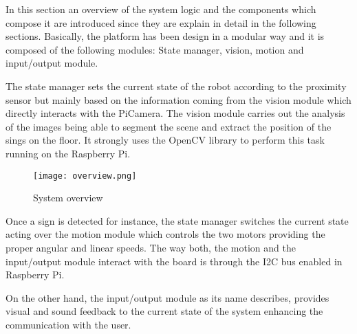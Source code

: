 In this section an overview of the system logic and the components which compose it are introduced since they are explain in detail in the following sections. Basically, the platform has been design in a modular way and it is composed of the following modules: State manager, vision, motion and input/output module.

The state manager sets the current state of the robot according to the proximity sensor but mainly based on the information coming from the vision module which directly interacts with the PiCamera. The vision module carries out the analysis of the images being able to segment the scene and extract the position of the sings on the floor. It strongly uses the OpenCV library to perform this task running on the Raspberry Pi. 

\begin{figure}[h!]
     \centering
     \texttt{[image: overview.png]}
     \caption{System overview}
     \label{fig:overview}
\end{figure}

Once a sign is detected for instance, the state manager switches the current state acting over the motion module which controls the two motors providing the proper angular and linear speeds. The way both, the motion and the input/output module interact with the board is through the I2C bus enabled in Raspberry Pi.

On the other hand, the input/output module as its name describes, provides visual and sound feedback to the current state of the system enhancing the communication with the user.
